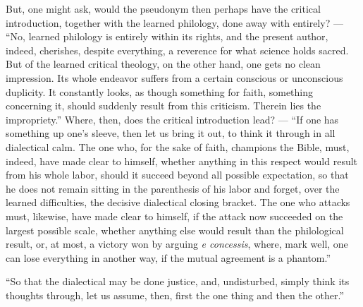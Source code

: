 \documentclass[12pt]{book}
\begin{document}
But, one might ask, would the pseudonym then perhaps have the critical introduction, together with the learned philology, done away with entirely? --- ``No, learned philology is entirely within its rights, and the present author, indeed, cherishes, despite everything, a reverence for what science holds sacred. But of the learned critical theology, on the other hand, one gets no clean impression. Its whole endeavor suffers from a certain conscious or unconscious duplicity. It constantly looks, as though something for faith, something concerning it, should suddenly result from this criticism. Therein lies the impropriety.'' Where, then, does the critical introduction lead? ---
``If one has something up one's sleeve, then let us bring it out, to think it through in all dialectical calm. The one who, for the sake of faith, champions the Bible, must, indeed, have made clear to himself, whether anything in this respect would result from his whole labor, should it succeed beyond all possible expectation, so that he does not remain sitting in the parenthesis of his labor and forget, over the learned difficulties, the decisive dialectical closing bracket. The one who attacks must, likewise, have made clear to himself, if the attack now succeeded on the largest possible scale, whether anything else would result than the philological result, or, at most, a victory won by arguing \textit{e concessis}, where, mark well, one can lose everything in another way, if the mutual agreement is a phantom.''

``So that the dialectical may be done justice, and, undisturbed, simply think its thoughts through, let us assume, then, first the one thing and then the other.''
\end{document}
